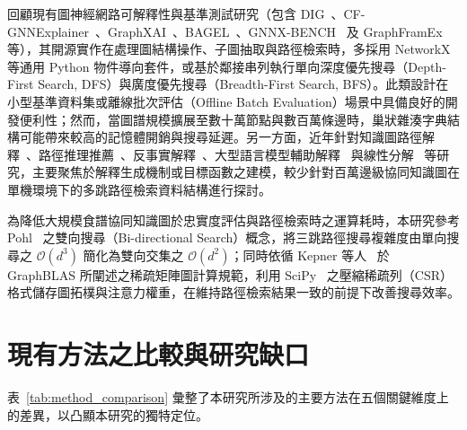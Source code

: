 回顧現有圖神經網路可解釋性與基準測試研究（包含 DIG~\cite{liu2021dig}、CF-GNNExplainer~\cite{lucic2022cfgnnexplainer}、GraphXAI~\cite{agarwal2023evaluating}、BAGEL~\cite{rathee2024bagel}、GNNX-BENCH~\cite{kosan2024gnnxbench} 及 GraphFramEx~\cite{amara2024graphframex} 等），其開源實作在處理圖結構操作、子圖抽取與路徑檢索時，多採用 NetworkX~\cite{hagberg2008networkx} 等通用 Python 物件導向套件，或基於鄰接串列執行單向深度優先搜尋（Depth-First Search, DFS）與廣度優先搜尋（Breadth-First Search, BFS）。此類設計在小型基準資料集或離線批次評估（Offline Batch Evaluation）場景中具備良好的開發便利性；然而，當圖譜規模擴展至數十萬節點與數百萬條邊時，巢狀雜湊字典結構可能帶來較高的記憶體開銷與搜尋延遲。另一方面，近年針對知識圖路徑解釋~\cite{ma2025kgexplainer, sun2025expath}、路徑推理推薦~\cite{yang2024pr4sr}、反事實解釋~\cite{liu2025cocounter}、大型語言模型輔助解釋~\cite{ma2024xrec, zhang2024natural} 與線性分解~\cite{johnson2024xlightgcn} 等研究，主要聚焦於解釋生成機制或目標函數之建模，較少針對百萬邊級協同知識圖在單機環境下的多跳路徑檢索資料結構進行探討。

為降低大規模食譜協同知識圖於忠實度評估與路徑檢索時之運算耗時，本研究參考 Pohl~\cite{pohl1971bi} 之雙向搜尋（Bi-directional Search）概念，將三跳路徑搜尋複雜度由單向搜尋之 $\mathcal{O}(d^3)$ 簡化為雙向交集之 $\mathcal{O}(d^2)$；同時依循 Kepner 等人~\cite{kepner2016graphblas} 於 GraphBLAS 所闡述之稀疏矩陣圖計算規範，利用 SciPy~\cite{virtanen2020scipy} 之壓縮稀疏列（CSR）格式儲存圖拓樸與注意力權重，在維持路徑檢索結果一致的前提下改善搜尋效率。


\section{現有方法之比較與研究缺口}


表~\ref{tab:method_comparison} 彙整了本研究所涉及的主要方法在五個關鍵維度上的差異，以凸顯本研究的獨特定位。

